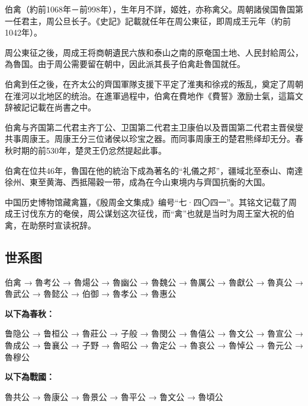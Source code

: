 伯禽（約前1068年－前998年），生年月不詳，姬姓，亦称禽父。周朝諸侯国魯国第一任君主，周公旦长子。《史記》記載就任年在周公東征，即周成王元年（約前1042年）。

周公東征之後，周成王将商朝遺民六族和泰山之南的原奄国土地、人民封給周公，為魯国。由于周公需要留在朝中，因此派其長子伯禽赴魯国就任。

伯禽到任之後，在齐太公的齊国軍隊支援下平定了淮夷和徐戎的叛乱，奠定了周朝在淮河以北地区的统治。在進軍過程中，伯禽在費地作《費誓》激励士氣，這篇文辞被記记載在尚書之中。

伯禽与齐国第二代君主齐丁公、卫国第二代君主卫康伯以及晋国第二代君主晋侯燮共事周康王。周康王分三位诸侯以珍宝之器。而同事周康王的楚君熊绎却无分。春秋时期的前530年，楚灵王仍忿然提起此事。

伯禽在位共46年，魯国在他的統治下成為著名的“礼儀之邦”，疆域北至泰山、南達徐州、東至黄海、西抵陽穀一带，成為在今山東境内与齊国抗衡的大国。

中国历史博物馆藏禽簋，《殷周金文集成》编号“七·四〇四一”。其铭文记载了周成王讨伐东方的奄侯，周公谋划这次征伐，而“禽”也就是当时为周王室大祝的伯禽，在助祭时宣读祝辞。

\subsection{世系图}

\noindent 伯禽 → 魯考公 → 魯煬公 → 魯幽公 → 魯魏公 → 魯厲公 → 魯獻公 → 魯真公 → 魯武公 → 魯懿公 → 伯御 → 魯孝公 → 魯惠公

\textbf{以下為春秋：}

\noindent 鲁隐公 → 鲁桓公 → 魯莊公 → 子般 → 魯閔公 → 魯僖公 → 魯文公 → 魯宣公 → 魯成公 → 鲁襄公 → 子野 → 魯昭公 → 魯定公 → 魯哀公 → 魯悼公 → 魯元公 → 魯穆公

\textbf{以下為戰國：}

\noindent 魯共公 → 魯康公 → 魯景公 → 魯平公 → 鲁文公 → 魯頃公


















